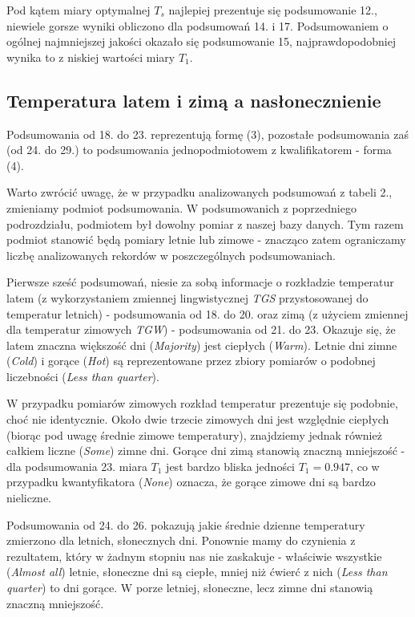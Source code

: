 \documentclass{classrep}
\begin{document}
Pod kątem miary optymalnej $T_s$ najlepiej prezentuje się podsumowanie 12., niewiele gorsze wyniki obliczono dla podsumowań 14. i 17. Podsumowaniem o ogólnej najmniejszej jakości okazało się podsumowanie 15, najprawdopodobniej wynika to z niskiej wartości miary $T_1$.

\subsection{Temperatura latem i zimą a nasłonecznienie}
Podsumowania od 18. do 23. reprezentują formę (3), pozostałe podsumowania zaś (od 24. do 29.) to podsumowania jednopodmiotowem z kwalifikatorem - forma (4).\newline

Warto zwrócić uwagę, że w przypadku analizowanych podsumowań z tabeli 2., zmieniamy podmiot podsumowania. W podsumowanich z poprzedniego podrozdziału, podmiotem był dowolny pomiar z naszej bazy danych. Tym razem podmiot stanowić będą pomiary letnie lub zimowe - znacząco zatem ograniczamy liczbę analizowanych rekordów w poszczególnych podsumowaniach.\newline

Pierwsze sześć podsumowań, niesie za sobą informacje o rozkładzie temperatur latem (z wykorzystaniem zmiennej lingwistycznej \textit{TGS} przystosowanej do temperatur letnich) - podsumowania od 18. do 20. oraz zimą (z użyciem zmiennej dla temperatur zimowych \textit{TGW}) - podsumowania od 21. do 23. Okazuje się, że latem znaczna większość dni (\textit{Majority}) jest ciepłych (\textit{Warm}). Letnie dni zimne (\textit{Cold}) i gorące (\textit{Hot}) są reprezentowane przez zbiory pomiarów o podobnej liczebności (\textit{Less than quarter}).\newline

W przypadku pomiarów zimowych rozkład temperatur prezentuje się podobnie, choć nie identycznie. Około dwie trzecie zimowych dni jest względnie ciepłych (biorąc pod uwagę średnie zimowe temperatury), znajdziemy jednak również całkiem liczne (\textit{Some}) zimne dni. Gorące dni zimą stanowią znaczną mniejszość - dla podsumowania 23. miara $T_1$ jest bardzo bliska jedności $T_1 = 0.947$, co w przypadku kwantyfikatora (\textit{None}) oznacza, że gorące zimowe dni są bardzo nieliczne.\newline

Podsumowania od 24. do 26. pokazują jakie średnie dzienne temperatury zmierzono dla letnich, słonecznych dni. Ponownie mamy do czynienia z rezultatem, który w żadnym stopniu nas nie zaskakuje - właściwie wszystkie (\textit{Almost all}) letnie, słoneczne dni są ciepłe, mniej niż ćwierć z nich (\textit{Less than quarter}) to dni gorące. W porze letniej, słoneczne, lecz zimne dni stanowią znaczną mniejszość.\newline
\end{document}
